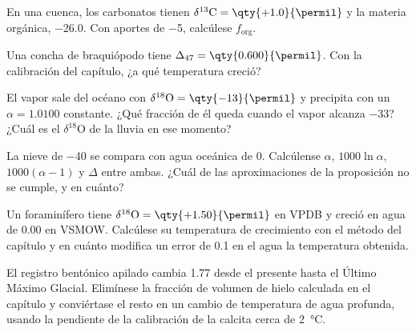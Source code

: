 \begin{exercise}[$\star$]\label{exo:b3:stable-isotopes:3}
En una cuenca, los carbonatos tienen $\delta^{13}\mathrm C = \qty{+1.0}{\permil}$ y la materia
orgánica, \qty{-26.0}{\permil}. Con aportes de \qty{-5}{\permil}, calcúlese
$f_{\mathrm{org}}$.
\end{exercise}

\begin{exercise}[$\star$]\label{exo:b3:stable-isotopes:4}
Una concha de braquiópodo tiene $\Delta_{47} = \qty{0.600}{\permil}$. Con la calibración
del capítulo, ¿a qué temperatura creció?
\end{exercise}

\begin{exercise}[$\star\star$]\label{exo:b3:stable-isotopes:5}
El vapor sale del océano con $\delta^{18}\mathrm O = \qty{-13}{\permil}$ y precipita
con un $\alpha = 1.0100$ constante. ¿Qué fracción de él queda cuando el
vapor alcanza \qty{-33}{\permil}? ¿Cuál es el $\delta^{18}\mathrm O$ de la lluvia
en ese momento?
\end{exercise}

\begin{exercise}[$\star\star$]\label{exo:b3:stable-isotopes:6}
La nieve de \qty{-40}{\permil} se compara con agua oceánica de 0. Calcúlense $\alpha$,
$1000\ln\alpha$, $1000(\alpha - 1)$ y $\Delta$ entre ambas. ¿Cuál de las
aproximaciones de la proposición no se cumple, y en cuánto?
\end{exercise}

\begin{exercise}[$\star\star$]\label{exo:b3:stable-isotopes:7}
Un foraminífero tiene $\delta^{18}\mathrm O = \qty{+1.50}{\permil}$ en VPDB y creció en
agua de \qty{0.00}{\permil} en VSMOW. Calcúlese su temperatura de crecimiento con el
método del capítulo y en cuánto modifica un error de \qty{0.1}{\permil} en el agua
la temperatura obtenida.
\end{exercise}

\begin{exercise}[$\star\star$]\label{exo:b3:stable-isotopes:8}
El registro bentónico apilado cambia \qty{1.77}{\permil} desde el presente hasta el
Último Máximo Glacial. Elimínese la fracción de volumen de hielo calculada en el capítulo y
conviértase el resto en un cambio de temperatura de agua profunda, usando la pendiente de
la calibración de la calcita cerca de \qty{2}{\celsius}.
\end{exercise}

